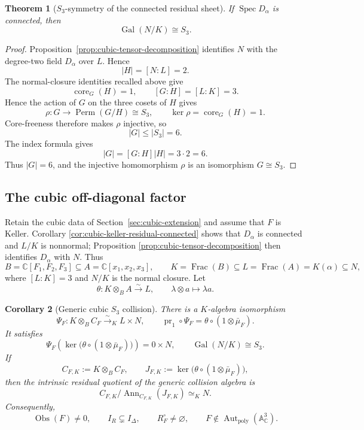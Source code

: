 \documentclass[11pt]{article}
\newtheorem{theorem}{Theorem}[section]
\newtheorem{corollary}[theorem]{Corollary}
\theoremstyle{remark}
\theoremstyle{definition}
\DeclareMathOperator{\Spec}{Spec}
\DeclareMathOperator{\Frac}{Frac}
\DeclareMathOperator{\Gal}{Gal}
\DeclareMathOperator{\Aut}{Aut}
\DeclareMathOperator{\Ann}{Ann}
\DeclareMathOperator{\core}{core}
\newcommand{\A}{\mathbb A}
\newcommand{\C}{\mathbb C}
\newcommand{\Obs}{\operatorname{Obs}}
\begin{document}
\begin{theorem}[\(S_3\)-symmetry of the connected residual sheet]
\label{thm:index-three-core-free-s3}
If \(\Spec D_\alpha\) is connected, then
\[
  \Gal(N/K)\cong S_3.
\]
\end{theorem}

\begin{proof}
Proposition~\ref{prop:cubic-tensor-decomposition} identifies \(N\) with
the degree-two field \(D_\alpha\) over \(L\).  Hence
\[
  |H|=[N:L]=2.
\]
The normal-closure identities recalled above give
\[
  \core_G(H)=1,
  \qquad
  [G:H]=[L:K]=3.
\]
Hence the action of \(G\) on the three cosets of \(H\) gives
\[
  \rho\colon G\longrightarrow\operatorname{Perm}(G/H)\cong S_3,
  \qquad
  \ker\rho=\core_G(H)=1.
\]
Core-freeness therefore makes \(\rho\) injective, so
\[
  |G|\leq |S_3|=6.
\]
The index formula gives
\[
  |G|=[G:H]|H|=3\cdot2=6.
\]
Thus \(|G|=6\), and the injective homomorphism \(\rho\) is an
isomorphism \(G\cong S_3\).
\end{proof}

\subsection{The cubic off-diagonal factor}

Retain the cubic data of Section~\ref{sec:cubic-extension} and assume that
\(F\) is Keller.  Corollary
\ref{cor:cubic-keller-residual-connected} shows that \(D_\alpha\) is
connected and \(L/K\) is nonnormal; Proposition
\ref{prop:cubic-tensor-decomposition} then identifies \(D_\alpha\) with
\(N\).  Thus
\[
  B=\C[F_1,F_2,F_3]\subseteq A=\C[x_1,x_2,x_3],
  \qquad
  K=\Frac(B)\subseteq L=\Frac(A)=K(\alpha)\subseteq N,
\]
where \([L:K]=3\) and \(N/K\) is the normal closure.  Let
\[
  \theta\colon K\otimes_BA\xrightarrow{\sim}L,
  \qquad
  \lambda\otimes a\longmapsto\lambda a.
\]

\begin{corollary}[Generic cubic \(S_3\) collision]
\label{cor:cubic-s3-collision}
There is a \(K\)-algebra isomorphism
\[
  \Psi_F\colon
  K\otimes_BC_F\xrightarrow{\sim}_K L\times N,
  \qquad
  \operatorname{pr}_1\circ\Psi_F
  =
  \theta\circ(1\otimes\bar\mu_F).
\]
It satisfies
\[
  \Psi_F\!\left(
    \ker\bigl(\theta\circ(1\otimes\bar\mu_F)\bigr)
  \right)
  =
  0\times N,
  \qquad
  \Gal(N/K)\cong S_3.
\]
If
\[
  C_{F,K}:=K\otimes_BC_F,
  \qquad
  J_{F,K}:=\ker\bigl(\theta\circ(1\otimes\bar\mu_F)\bigr),
\]
then the intrinsic residual quotient of the generic collision algebra is
\[
  C_{F,K}/\Ann_{C_{F,K}}(J_{F,K})\simeq_K N.
\]
Consequently,
\[
  \Obs(F)\neq0,
  \qquad
  I_R\subsetneq I_\Delta,
  \qquad
  R_F^\circ\neq\varnothing,
  \qquad
  F\notin\Aut_{\mathrm{poly}}(\A^3_{\C}).
\]
\end{corollary}
\end{document}
